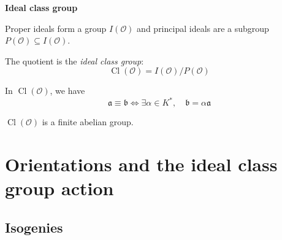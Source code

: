 \documentclass[10pt]{beamer}
\theoremstyle{plain}
\theoremstyle{definition}
\newcommand{\N}{\mathbb{N}}
\newcommand{\mO}{\mathcal{O}}
\renewcommand{\(}{\left(}
\renewcommand{\)}{\right)}
\newcommand{\mf}[1]{\mathfrak{#1}}
\DeclareMathOperator{\Cl}{Cl}
\begin{document}






\begin{frame}

\textbf{Ideal class group}

\vspace{0.5cm}

\begin{definition}
Proper ideals form a group $I(\mO)$ and principal ideals are a subgroup $P(\mO)\subseteq I(\mO)$. 

The quotient is the \emph{ideal class group}:
\[\Cl(\mO)=I(\mO)/P(\mO)\]
\end{definition}

In $\Cl(\mO)$, we have
\[\mf{a}\equiv \mf{b}\Longleftrightarrow \exists\alpha\in K^*, \quad \mf{b}=\alpha\mf{a}\]

\pause

\begin{theorem}
$\Cl(\mO)$ is a finite abelian group.
\end{theorem}

\end{frame}


\section{Orientations and the ideal class group action}

\subsection{Isogenies}
\end{document}
